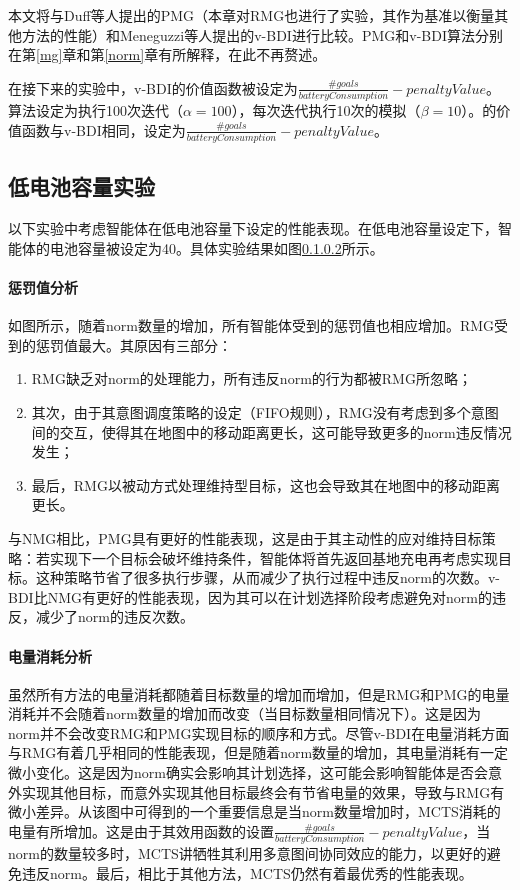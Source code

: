 本文将\SAN 与Duff等人\cite{DBLP:conf/atal/DuffHT06}提出的PMG（本章对RMG也进行了实验，其作为基准以衡量其他方法的性能）和Meneguzzi等人\cite{DBLP:journals/eaai/MeneguzziROVL15}提出的v-BDI进行比较。PMG和v-BDI算法分别在第\ref{mg}章和第\ref{norm}章有所解释，在此不再赘述。

在接下来的实验中，v-BDI的价值函数被设定为$\frac{\#goals}{batteryConsumption} - penaltyValue$。\SAN 算法设定为执行100次迭代（$\alpha = 100$），每次迭代执行10次的模拟（$\beta = 10$）。\SAN 的价值函数与v-BDI相同，设定为$\frac{\#goals}{batteryConsumption} - penaltyValue$。

\subsection{低电池容量实验}
以下实验中考虑智能体在低电池容量下设定的性能表现。在低电池容量设定下，智能体的电池容量被设定为40。具体实验结果如图\ref{}所示。

\paragraph{惩罚值分析}
如图所示，随着norm数量的增加，所有智能体受到的惩罚值也相应增加。RMG受到的惩罚值最大。其原因有三部分：
\begin{enumerate}
  \item RMG缺乏对norm的处理能力，所有违反norm的行为都被RMG所忽略；
  \item 其次，由于其意图调度策略的设定（FIFO规则），RMG没有考虑到多个意图间的交互，使得其在地图中的移动距离更长，这可能导致更多的norm违反情况发生；
  \item 最后，RMG以被动方式处理维持型目标，这也会导致其在地图中的移动距离更长。
\end{enumerate}
与NMG相比，PMG具有更好的性能表现，这是由于其主动性的应对维持目标策略：若实现下一个目标会破坏维持条件，智能体将首先返回基地充电再考虑实现目标。这种策略节省了很多执行步骤，从而减少了执行过程中违反norm的次数。v-BDI比NMG有更好的性能表现，因为其可以在计划选择阶段考虑避免对norm的违反，减少了norm的违反次数。
\paragraph{电量消耗分析}
虽然所有方法的电量消耗都随着目标数量的增加而增加，但是RMG和PMG的电量消耗并不会随着norm数量的增加而改变（当目标数量相同情况下）。这是因为norm并不会改变RMG和PMG实现目标的顺序和方式。尽管v-BDI在电量消耗方面与RMG有着几乎相同的性能表现，但是随着norm数量的增加，其电量消耗有一定微小变化。这是因为norm确实会影响其计划选择，这可能会影响智能体是否会意外实现其他目标，而意外实现其他目标最终会有节省电量的效果，导致与RMG有微小差异。从该图中可得到的一个重要信息是当norm数量增加时，MCTS消耗的电量有所增加。这是由于其效用函数的设置$\frac{\#goals}{batteryConsumption} - penaltyValue$，当norm的数量较多时，MCTS讲牺牲其利用多意图间协同效应的能力，以更好的避免违反norm。最后，相比于其他方法，MCTS仍然有着最优秀的性能表现。
